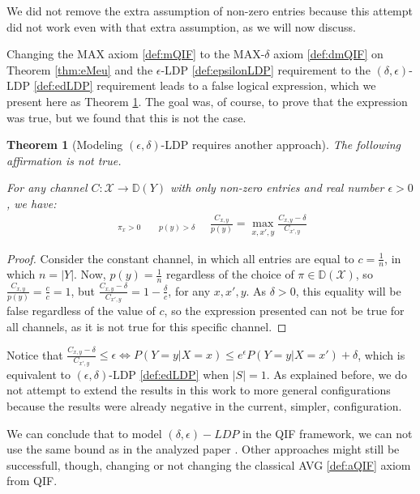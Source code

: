 \documentclass[conference]{IEEEtran}
\newtheorem{theorem}{Theorem}
\newcommand{\X}{\mathcal{X}}
\newcommand{\D}{\mathbb{D}}
\newcommand{\DX}{\mathbb{D}(\mathcal{X})}
\begin{document}
We did not remove the extra assumption of non-zero entries because this attempt did not work even with that extra assumption, as we will now discuss.

Changing the MAX axiom \ref{def:mQIF} to the MAX-$\delta$ axiom \ref{def:dmQIF} on Theorem \ref{thm:eMeu} and the $\epsilon$-LDP \ref{def:epsilonLDP} requirement to the $(\delta,\epsilon)$-LDP \ref{def:edLDP} requirement leads to a false logical expression, which we present here as Theorem \ref{thm:edMeu}. The goal was, of course, to prove that the expression was true, but we found that this is not the case.

\begin{theorem}[Modeling $(\epsilon,\delta)$-LDP requires another approach]\label{thm:edMeu}The following affirmation is not true.

For any channel $C: \X \rightarrow \D(Y)$ with only non-zero entries and real number $\epsilon > 0$, we have:
\begin{align*}
\mathop{\sup_{\pi\in\DX:}}_{\pi_x>0}\quad\mathop{\max_{x\in\X,y\in Y:}}_{p(y) > \delta}\quad\frac{C_{x,y}}{p(y)} = \max_{x,x',y}\frac{C_{x,y}-\delta}{C_{x',y}}
\end{align*}
\end{theorem}
\begin{proof}
Consider the constant channel, in which all entries are equal to $c = \frac{1}{n}$, in which $n = |Y|$. Now, $p(y) = \frac{1}{n}$ regardless of the choice of $\pi \in \DX$, so $\frac{C_{x,y}}{p(y)} = \frac{c}{c} = 1$, but $\frac{C_{x,y}-\delta}{C_{x',y}} = 1 - \frac{\delta}{c}$, for any $x,x',y$. As $\delta > 0$, this equality will be false regardless of the value of $c$, so the expression presented can not be true for all channels, as it is not true for this specific channel.
\end{proof}

Notice that $\frac{C_{x,y}-\delta}{C_{x',y}} \leq \epsilon \iff P(Y=y|X=x)\leq e^\epsilon P(Y=y|X=x')+\delta$, which is equivalent to $(\epsilon,\delta)$-LDP \ref{def:edLDP} when $|S| = 1$. As explained before, we do not attempt to extend the results in this work to more general configurations because the results were already negative in the current, simpler, configuration.

We can conclude that to model $(\delta,\epsilon)-LDP$ in the QIF framework, we can not use the same bound as in the analyzed paper \cite{fernandes2024explaining}. Other approaches might still be successfull, though, changing or not changing the classical AVG \ref{def:aQIF} axiom from QIF.
\end{document}
